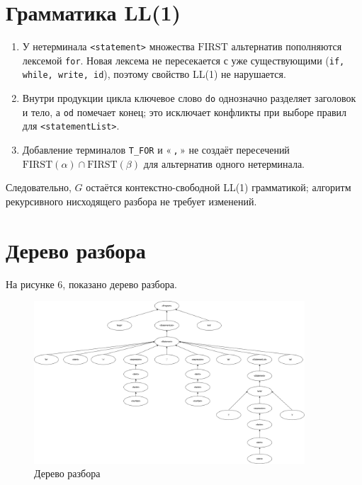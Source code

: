 \documentclass[areasetadvanced]{scrartcl}
\begin{document}
\section{Грамматика LL(1)}

\begin{enumerate}[label=\arabic*)]
  \item У нетерминала \verb|<statement>| множества
        $\text{FIRST}$ альтернатив пополняются лексемой
        \texttt{for}.  Новая лексема не пересекается
        с уже существующими (\texttt{if, while, write, id}),
        поэтому свойство LL(1) не нарушается.
  \item Внутри продукции цикла ключевое слово \texttt{do}
        однозначно разделяет заголовок и тело,  
        а \texttt{od} помечает конец;  
        это исключает конфликты
        при выборе правил для \verb|<statementList>|.
  \item Добавление терминалов \texttt{T\_FOR} и «\,\texttt{,}\,»
        не создаёт пересечений
        $\text{FIRST}(\alpha)\cap\text{FIRST}(\beta)$
        для альтернатив одного нетерминала.
\end{enumerate}

Следовательно, $G$ остаётся контекстно-свободной LL(1)
грамматикой; алгоритм рекурсивного нисходящего разбора
не требует изменений.

\newpage
\section{Дерево разбора}
На рисунке 6, показано дерево разбора. 
\begin{figure}[H]
    \centering
    \includegraphics[width=0.9\textwidth]{tree.png}
    \caption{Дерево разбора}
\end{figure}
\end{document}
